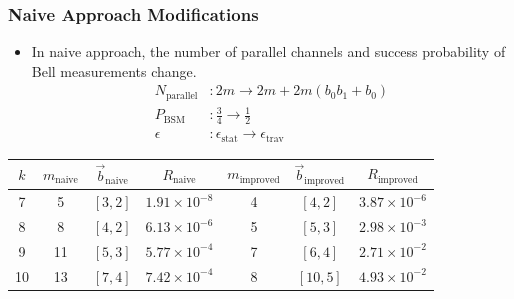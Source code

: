 \documentclass[aspectratio=169,xcolor=dvipsnames]{beamer}
\begin{document}
    \begin{frame}
    \frametitle{Naive Approach Modifications}
    \begin{itemize}
        \item In naive approach, the number of parallel channels and success probability of Bell measurements change.
        \begin{align*}
            N_\text{parallel}&: 2m \rightarrow 2m + 2m(b_0b_1+b_0) \\ 
            P_\text{BSM}&: \frac{3}{4} \rightarrow \frac{1}{2} \\ 
            \epsilon&: \epsilon_\text{stat} \rightarrow \epsilon_\text{trav}
        \end{align*}
    \end{itemize}
    \begin{center}
        \centering
        \begin{tabular}{|c|c|c|c|c|c|c|}
            \hline
            $k$ & $m_\text{naive}$ & $\vec{b}_\text{naive}$ & $R_\text{naive}$ & $m_\text{improved}$ & $\vec{b}_\text{improved}$ & $R_\text{improved}$ \\
            \hline
            7   & 5                & $[3, 2]$              & $1.91 \times 10^{-8}$ & 4                   & $[4, 2]$                 & $3.87 \times 10^{-6}$ \\
            8   & 8                & $[4, 2]$              & $6.13 \times 10^{-6}$ & 5                   & $[5, 3]$                 & $2.98 \times 10^{-3}$ \\
            9   & 11               & $[5, 3]$              & $5.77 \times 10^{-4}$ & 7                   & $[6, 4]$                 & $2.71 \times 10^{-2}$ \\
            10  & 13               & $[7, 4]$              & $7.42 \times 10^{-4}$ & 8                   & $[10, 5]$                & $4.93 \times 10^{-2}$ \\
            \hline
        \end{tabular}
        \end{center}
    
    \end{frame}
\end{document}
